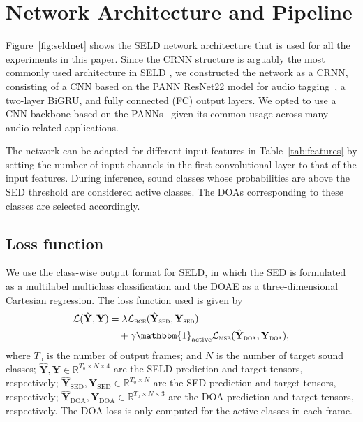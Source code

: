 \documentclass[journal]{IEEEtran}
\newcommand{\mbf}{\mathbf}
\begin{document}
 \section{Network Architecture and Pipeline}
\label{sec:net}

Figure~\ref{fig:seldnet} shows the SELD network architecture that is used for all the experiments in this paper. Since the CRNN structure is arguably the most commonly used architecture in SELD \cite{Adavanne2019SoundNetworks, Cao2019PolyphonicStrategy, Nguyen2020ADetection, Xue2020SoundLearning, Shimada2021ACCDOA:Detection, Sato2021AmbisonicEquivariance, Phan2020OnLocalization, Park2020SoundFunctions, Emmanuel2021Multi-scaleDetection, Kapka2019SoundModels, Wang2020TheChallenge, Shimada2021EnsembleDetection, Nguyen2021DCASEDetection}, we constructed the network as a CRNN, consisting of a CNN based on the PANN ResNet22 model for audio tagging~\cite{Kong2020PANNs:Recognition}, a two-layer BiGRU, and fully connected (FC) output layers. We opted to use a CNN backbone based on the PANNs~\cite{Kong2020PANNs:Recognition} given its common usage across many audio-related applications.

The network can be adapted for different input features in Table~\ref{tab:features} by setting the number of input channels in the first convolutional layer to that of the input features. During inference, sound classes whose probabilities are above the SED threshold are considered active classes. The DOAs corresponding to these classes are selected accordingly.

\subsection{Loss function}

We use the class-wise output format for SELD, in which the SED is formulated as a multilabel multiclass classification and the DOAE as a three-dimensional Cartesian regression. The loss function used is given by 
\begin{equation}
\begin{split}
    \mathcal{L}(\hat{\mbf{Y}}, \mbf{Y}) &= 
         \lambda \mathcal{L}_\textsc{bce}(\hat{\mbf{Y}}_{\textsc{sed}}, \mbf{Y}_{\textsc{sed}})\\&\quad+ \gamma \mathbbm{1}_\text{active} \mathcal{L}_\textsc{mse}(\hat{\mbf{Y}}_{\textsc{doa}}, \mbf{Y}_{\textsc{doa}}),
\end{split}
    \label{eq:loss}    
\end{equation}
where $T_\text{o}$ is the number of output frames; and $N$ is the number of target sound classes; $\hat{\mbf{Y}}, \mbf{Y} \in\mathbb{R}^{T_\text{o}\times N\times 4}$ are the SELD prediction and target tensors, respectively; $\hat{\mbf{Y}}_{\text{SED}}, \mbf{Y}_{\text{SED}} \in \mathbb{R}^{T_\text{o}\times N}$ are the SED prediction and target tensors, respectively; $\hat{\mbf{Y}}_{\text{DOA}}, \mbf{Y}_{\text{DOA}} \in \mathbb{R}^{T_\text{o}\times N\times 3}$ are the DOA prediction and target tensors, respectively. The DOA loss is only computed for the active classes in each frame.  
\end{document}

